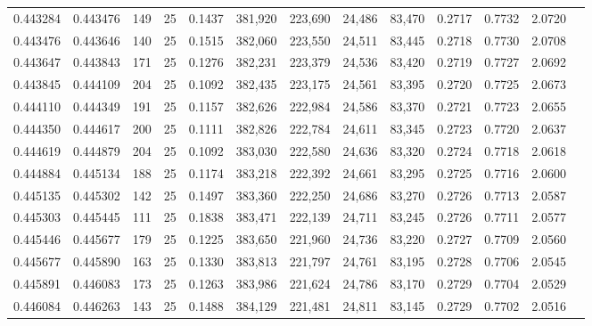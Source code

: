 \begin{tabular}{rrrrrrrrrrrrr}
0.443284 & 0.443476 &   149 &  25 &                                     0.1437 & 381,920 & 223,690 &  24,486 &  83,470 & 0.2717 & 0.7732 & 2.0720 \\
0.443476 & 0.443646 &   140 &  25 &                                     0.1515 & 382,060 & 223,550 &  24,511 &  83,445 & 0.2718 & 0.7730 & 2.0708 \\
0.443647 & 0.443843 &   171 &  25 &                                     0.1276 & 382,231 & 223,379 &  24,536 &  83,420 & 0.2719 & 0.7727 & 2.0692 \\
0.443845 & 0.444109 &   204 &  25 &                                     0.1092 & 382,435 & 223,175 &  24,561 &  83,395 & 0.2720 & 0.7725 & 2.0673 \\
0.444110 & 0.444349 &   191 &  25 &                                     0.1157 & 382,626 & 222,984 &  24,586 &  83,370 & 0.2721 & 0.7723 & 2.0655 \\
0.444350 & 0.444617 &   200 &  25 &                                     0.1111 & 382,826 & 222,784 &  24,611 &  83,345 & 0.2723 & 0.7720 & 2.0637 \\
0.444619 & 0.444879 &   204 &  25 &                                     0.1092 & 383,030 & 222,580 &  24,636 &  83,320 & 0.2724 & 0.7718 & 2.0618 \\
0.444884 & 0.445134 &   188 &  25 &                                     0.1174 & 383,218 & 222,392 &  24,661 &  83,295 & 0.2725 & 0.7716 & 2.0600 \\
0.445135 & 0.445302 &   142 &  25 &                                     0.1497 & 383,360 & 222,250 &  24,686 &  83,270 & 0.2726 & 0.7713 & 2.0587 \\
0.445303 & 0.445445 &   111 &  25 &                                     0.1838 & 383,471 & 222,139 &  24,711 &  83,245 & 0.2726 & 0.7711 & 2.0577 \\
0.445446 & 0.445677 &   179 &  25 &                                     0.1225 & 383,650 & 221,960 &  24,736 &  83,220 & 0.2727 & 0.7709 & 2.0560 \\
0.445677 & 0.445890 &   163 &  25 &                                     0.1330 & 383,813 & 221,797 &  24,761 &  83,195 & 0.2728 & 0.7706 & 2.0545 \\
0.445891 & 0.446083 &   173 &  25 &                                     0.1263 & 383,986 & 221,624 &  24,786 &  83,170 & 0.2729 & 0.7704 & 2.0529 \\
0.446084 & 0.446263 &   143 &  25 &                                     0.1488 & 384,129 & 221,481 &  24,811 &  83,145 & 0.2729 & 0.7702 & 2.0516 \\

\end{tabular}

